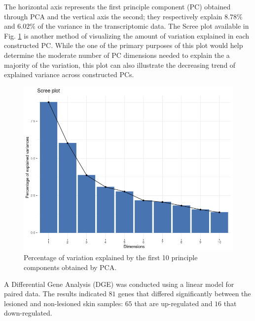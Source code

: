 \documentclass[journal, a4paper]{IEEEtran}
\begin{document}
The horizontal axis represents the first principle component (PC) obtained through PCA and the vertical axis the second; they respectively explain $8.78\%$ and $6.02\%$ of the variance in the transcriptomic data. The Scree plot available in Fig. \ref{fig:scree-plot} is another method of visualizing the amount of variation explained in each constructed PC. While the one of the primary purposes of this plot would help determine the moderate number of PC dimensions needed to explain the a majority of the variation, this plot can also illustrate the decreasing trend of explained variance across constructed PCs.\\%

\begin{figure}[!htp]
    \begin{center}
    \begin{minipage}{0.5 \textwidth}
      \centering
      \includegraphics[width=\textwidth]{scree-plot.png}
      \caption{Percentage of variation explained by the first 10 principle components obtained by PCA.}
      \label{fig:scree-plot}
    \end{minipage}
  \end{center}
\end{figure}

A Differential Gene Analysis (DGE) was conducted using a linear model for paired data. The results indicated $81$ genes that differed significantly between the lesioned and non-lesioned skin samples: $65$ that are up-regulated and $16$ that down-regulated.\\%
\end{document}
